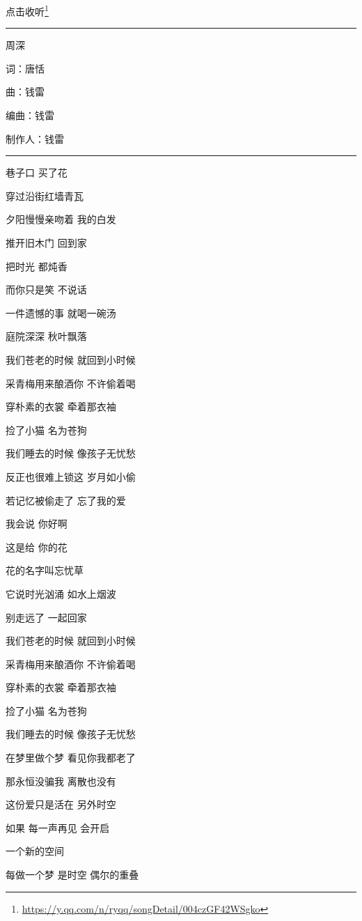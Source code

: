 \documentclass[]{ctexbook}
\renewcommand{\href}[2]{#2\footnote{\url{#1}}}
\begin{document}
\href{https://y.qq.com/n/ryqq/songDetail/004czGF42WSgko}{点击收听}

\begin{center}\rule{0.5\linewidth}{0.5pt}\end{center}

周深

词：唐恬

曲：钱雷

编曲：钱雷

制作人：钱雷

\begin{center}\rule{0.5\linewidth}{0.5pt}\end{center}

巷子口 买了花

穿过沿街红墙青瓦

夕阳慢慢亲吻着 我的白发

推开旧木门 回到家

把时光 都炖香

而你只是笑 不说话

一件遗憾的事 就喝一碗汤

庭院深深 秋叶飘落

我们苍老的时候 就回到小时候

采青梅用来酿酒你 不许偷着喝

穿朴素的衣裳 牵着那衣袖

捡了小猫 名为苍狗

我们睡去的时候 像孩子无忧愁

反正也很难上锁这 岁月如小偷

若记忆被偷走了 忘了我的爱

我会说 你好啊

这是给 你的花

花的名字叫忘忧草

它说时光汹涌 如水上烟波

别走远了 一起回家

我们苍老的时候 就回到小时候

采青梅用来酿酒你 不许偷着喝

穿朴素的衣裳 牵着那衣袖

捡了小猫 名为苍狗

我们睡去的时候 像孩子无忧愁

在梦里做个梦 看见你我都老了

那永恒没骗我 离散也没有

这份爱只是活在 另外时空

如果 每一声再见 会开启

一个新的空间

每做一个梦 是时空 偶尔的重叠
\end{document}
